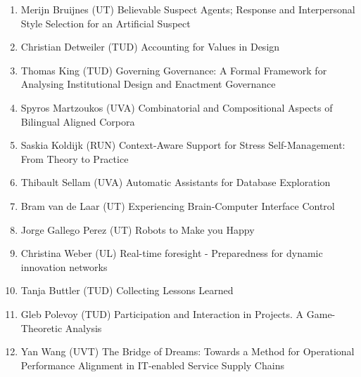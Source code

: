 \begin{multicols}{2}
\begin{scriptsize}
\begin{enumerate}[leftmargin=*,noitemsep,topsep=0pt,parsep=1pt,partopsep=0pt]
\item Merijn Bruijnes (UT) Believable Suspect Agents; Response and Interpersonal Style Selection for an Artificial Suspect
\item Christian Detweiler (TUD) Accounting for Values in Design
\item Thomas King (TUD) Governing Governance: A Formal Framework for Analysing Institutional Design and Enactment Governance
\item Spyros Martzoukos (UVA) Combinatorial and Compositional Aspects of Bilingual Aligned Corpora 
\item Saskia Koldijk (RUN) Context-Aware Support for Stress Self-Management: From Theory to Practice
\item Thibault Sellam (UVA) Automatic Assistants for Database Exploration
\item Bram van de Laar (UT) Experiencing Brain-Computer Interface Control
\item Jorge Gallego Perez (UT) Robots to Make you Happy
\item Christina Weber (UL) Real-time foresight - Preparedness for dynamic innovation networks
\item Tanja Buttler (TUD) Collecting Lessons Learned
\item Gleb Polevoy (TUD) Participation and Interaction in Projects. A Game-Theoretic Analysis
\item Yan Wang (UVT) The Bridge of Dreams: Towards a Method for Operational Performance Alignment in IT-enabled Service Supply Chains
\end{enumerate}


\end{scriptsize}
\end{multicols}
